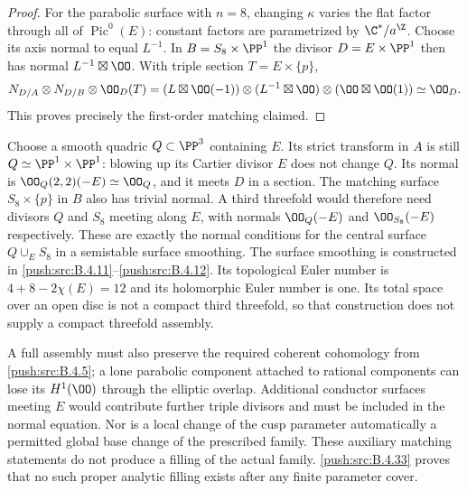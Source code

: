\begin{proof}
For the parabolic surface with $n=8$, changing $\kappa$ varies the
flat factor through all of $\operatorname{Pic}^0(E)$:
constant factors are parametrized by $\C^*/a^\Z$.
Choose its axis normal to equal $L^{-1}$.
In $B=S_8\times\PP^1$ the divisor $D=E\times\PP^1$ then has normal
$L^{-1}\boxtimes\OO$. With triple section $T=E\times\{p\}$,
\[
 N_{D/A}\otimes N_{D/B}\otimes\OO_D(T)
   =(L\boxtimes\OO(-1))\otimes
     (L^{-1}\boxtimes\OO)\otimes(\OO\boxtimes\OO(1))
   \simeq\OO_D.
\]
This proves precisely the first-order matching claimed.
\end{proof}

\begin{remark}
Choose a smooth quadric $Q\subset\PP^3$ containing $E$.
Its strict transform in $A$ is still $Q\simeq\PP^1\times\PP^1$:
blowing up its Cartier divisor $E$ does not change $Q$.
Its normal is
$\OO_Q(2,2)(-E)\simeq\OO_Q$, and it meets $D$ in a section.
The matching surface $S_8\times\{p\}$ in $B$ also has trivial
normal. A third threefold would therefore need divisors $Q$ and
$S_8$ meeting along $E$, with normals
$\OO_Q(-E)$ and $\OO_{S_8}(-E)$ respectively.
These are exactly the normal conditions for the central surface
$Q\cup_E S_8$ in a semistable surface smoothing.
The surface smoothing is constructed in \ref{push:src:B.4.11}--\ref{push:src:B.4.12}.
Its topological Euler number is $4+8-2\chi(E)=12$ and its
holomorphic Euler number is one. Its total space over an open
disc is not a compact third threefold, so that construction
does not supply a compact threefold assembly.

A full assembly must also preserve the required coherent cohomology
from \ref{push:src:B.4.5}; a lone parabolic component attached to rational components
can lose its $H^1(\OO)$ through the elliptic overlap.
Additional conductor surfaces meeting $E$ would contribute further
triple divisors and must be included in the normal equation.
Nor is a local change of the cusp parameter automatically a permitted
global base change of the prescribed family.
These auxiliary matching statements do not produce a filling
of the actual family. \ref{push:src:B.4.33} proves that no such proper analytic
filling exists after any finite parameter cover.
\end{remark}


